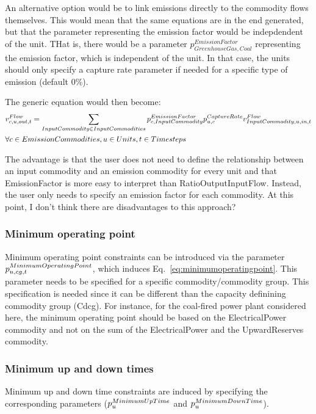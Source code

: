 {\color{red} An alternative option would be to link emissions directly to the commodity flows themselves. This would mean that the same equations are in the end generated, but that the parameter representing the emission factor would be indepdendent of the unit. THat is, there would be a parameter $p^{EmissionFactor}_{GreenhouseGas,Coal}$ representing the emission factor, which is independent of the unit. In that case, the units should only specify a capture rate parameter if needed for a specific type of emission (default 0\%).

The generic equation would then become:
\begin{align}
&\vFlow[\commodity,\unit,out,\timestep] = \sum_{InputCommodity \in InputCommodities} p^{EmissionFactor}_{\commodity,InputCommodity} p^{CaptureRate}_{\unit,\commodity} \vFlow[InputCommodity,\unit,in,\timestep] \nonumber \\
&  \forall \commodity \in EmissionCommodities, \units, \timesteps
\end{align}

The advantage is that the user does not need to define the relationship between an input commodity and an emission commodity for every unit and that EmissionFactor is more easy to interpret than RatioOutputInputFlow. Instead, the user only needs to specify an emission factor for each commodity. At this point, I don't think there are disadvantages to this approach?}


\subsubsection{Minimum operating point}
Minimum operating point constraints can be introduced via the parameter $\pMinimumOperatingPoint$, which induces Eq.~\eqref{eq:minimumoperatingpoint}. This parameter needs to be specified for a specific commodity/commodity group. This specification is needed since it can be different than the capacity definining commodity group (Cdcg). For instance, for the coal-fired power plant considered here, the minimum operating point should be based on the ElectricalPower commodity and not on the sum of the ElectricalPower and the UpwardReserves commodity.


\subsubsection{Minimum up and down times}
Minimum up and down time constraints are induced by specifying the corresponding parameters ($\pMinimumUpTime$ and $\pMinimumDownTime$).


